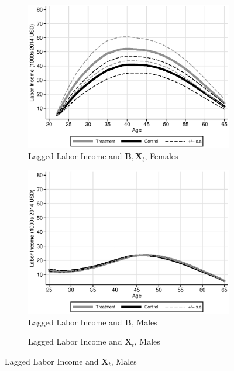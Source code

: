 \begin{figure}
\begin{subfigure}[h]{0.3\textwidth}
	\caption{Lagged Labor Income and $\bm{B}, \bm{X}_{t}$, Females}
		\includegraphics[width=\textwidth]{output/labor_25-65_pset1_mset3_male_sensitivity.eps}
\end{subfigure}
\begin{subfigure}[h]{0.3\textwidth}
		\centering
		\caption{Lagged Labor Income and $\bm{B}$, Males}
		\includegraphics[width=\textwidth]{output/labor_25-65_pset3_mset3_male.eps}
\end{subfigure}%
\begin{subfigure}[h]{0.3\textwidth}
	\centering
	\caption{Lagged Labor Income and $\bm{X}_{t}$, Males}

\end{subfigure}
\end{figure}
